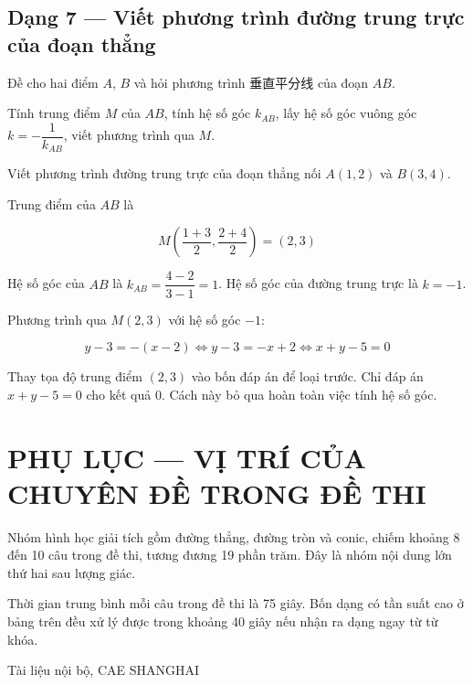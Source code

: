 \documentclass[11pt, a4paper]{article}
\begin{document}
\subsection{Dạng 7 — Viết phương trình đường trung trực của đoạn thẳng}

 Đề cho hai điểm $A$, $B$ và hỏi phương trình 垂直平分线 của đoạn $AB$.

 Tính trung điểm $M$ của $AB$, tính hệ số góc $k_{AB}$, lấy hệ số góc vuông góc $k = -\dfrac{1}{k_{AB}}$, viết phương trình qua $M$.

\begin{vidu}[{7}]
Viết phương trình đường trung trực của đoạn thẳng nối $A(1, 2)$ và $B(3, 4)$.

Trung điểm của $AB$ là

$$M\left(\frac{1+3}{2}, \frac{2+4}{2}\right) = (2, 3)$$

Hệ số góc của $AB$ là $k_{AB} = \dfrac{4-2}{3-1} = 1$. Hệ số góc của đường trung trực là $k = -1$.

Phương trình qua $M(2,3)$ với hệ số góc $-1$:

$$y - 3 = -(x - 2) \iff y - 3 = -x + 2 \iff x + y - 5 = 0$$

 Thay tọa độ trung điểm $(2,3)$ vào bốn đáp án để loại trước. Chỉ đáp án $x + y - 5 = 0$ cho kết quả $0$. Cách này bỏ qua hoàn toàn việc tính hệ số góc.

\end{vidu}
\section{PHỤ LỤC — VỊ TRÍ CỦA CHUYÊN ĐỀ TRONG ĐỀ THI}

Nhóm hình học giải tích gồm đường thẳng, đường tròn và conic, chiếm khoảng 8 đến 10 câu trong đề thi, tương đương 19 phần trăm. Đây là nhóm nội dung lớn thứ hai sau lượng giác.


Thời gian trung bình mỗi câu trong đề thi là 75 giây. Bốn dạng có tần suất cao ở bảng trên đều xử lý được trong khoảng 40 giây nếu nhận ra dạng ngay từ từ khóa.
\vspace{0.8cm}
\begin{center}
{\footnotesize\color{cae_blue} Tài liệu nội bộ, CAE SHANGHAI}
\end{center}
\end{document}
